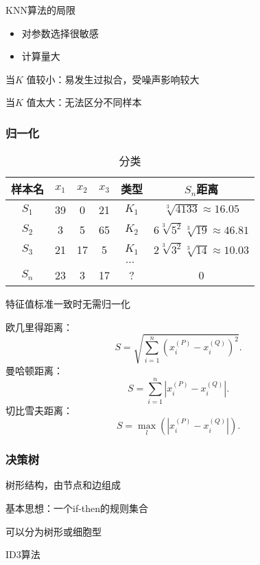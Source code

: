 KNN算法的局限
\begin{itemize}
    \item 对参数选择很敏感
    \item 计算量大
\end{itemize}
当$K$ 值较小：易发生过拟合，受噪声影响较大

当$K$ 值太大：无法区分不同样本
\subsubsection{归一化}%
\label{subsub:归一化}
\begin{table}[htpb]
    \centering
    \caption{分类}
    \label{tab:分类}
    \begin{tabular}{|c|c|c|c|c|c|}
    \hline
    样本名 & $x_1$ & $x_2$ & $x_3$ & 类型 & $S_n$距离 \\
    \hline
    $S_1$ & 39 & 0 & 21 & $K_1$ & $\sqrt[3]{4133}\approx 16.05 $\\
    \hline
    $S_2$ & 3 & 5 & 65 & $K_2$ & $6\sqrt[3]{5^2} \sqrt[3]{19}\approx 46.81 $\\
    \hline
    $S_3$ & 21 & 17 & 5 & $K_1$ & $2\sqrt[3]{3^2} \sqrt[3]{14}\approx 10.03 $\\
    \hline
    \multicolumn{6}{|c|}{$\ldots $} \\
    \hline
    $S_n$ & 23 & 3 & 17 & ? & 0\\
    \hline
    \end{tabular}
\end{table}
特征值标准一致时无需归一化
\begin{notation}
    欧几里得距离：\[
        S=\sqrt{\sum_{i=1}^{n} \left( x_{i}^{(P)}-x_{i}^{(Q)} \right) ^2} 
    .\] 
    曼哈顿距离：\[
        S=\sum_{i=1}^{n} \left| x_{i}^{(P)}-x_{i}^{(Q)} \right| 
    .\] 
    切比雪夫距离：\[
        S=\underset{l}{\max}\left( \left| x_{i}^{(P)}-x_{i}^{(Q)} \right|  \right) 
    .\] 
\end{notation}
\subsubsection{决策树}%
\label{subsub:决策树}
\begin{defi}
    树形结构，由节点和边组成
\end{defi}
基本思想：一个if-then的规则集合

可以分为树形或细胞型
\begin{center}
\end{center}
\begin{eg}
    ID3算法
\end{eg}
